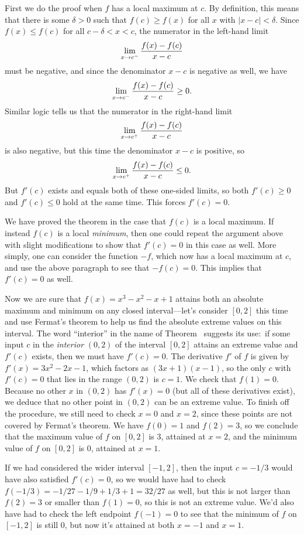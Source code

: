 \proof First we do the proof when $f$ has a local maximum at $c$. By definition, this means that there is some
$\delta > 0$ such that $f(c)\ge f(x)$ for all $x$ with $|x-c|<\delta$. Since $f(x) \le f(c)$ for all
$c-\delta < x<c$, the numerator in the left-hand limit
$$\lim_{x\to c^-} {f(x) - f(c)\over x-c}$$
must be negative, and since the denominator $x-c$ is negative as well, we have
$$\lim_{x\to c^-} {f(x) - f(c)\over x-c} \ge 0.$$
Similar logic tells us that the numerator in the right-hand limit
$$\lim_{x\to c^+} {f(x) - f(c) \over x-c}$$
is also negative, but this time the denominator $x-c$ is positive, so
$$\lim_{x\to c^+} {f(x) - f(c) \over x-c} \le 0.$$
But $f'(c)$ exists and equals both of these one-sided limits, so both $f'(c) \ge 0$ and $f'(c)\le 0$
hold at the same time. This forces $f'(c) = 0$.

We have proved the theorem in the case that $f(c)$ is a local maximum. If instead $f(c)$ is a local
{\it minimum}, then one could repeat the argument above with slight modifications to show that
$f'(c) = 0$ in this case as well. More simply, one can consider the function $-f$, which now has a local
maximum at $c$, and use
the above paragraph to see that $-f(c) = 0$. This implies that $f'(c) = 0$ as well.\slug

Now we are sure that $f(x) = x^3 - x^2 - x + 1$ attains both an absolute maximum and minimum
on any closed interval---let's consider $[0,2]$ this time and use Fermat's theorem to help us
find the absolute extreme values on this interval. The word ``interior'' in the name
of Theorem~{\thmfermat} suggests its use:~if some input $c$ in the {\it interior} $(0,2)$ of the
interval $[0,2]$ attains an extreme value and $f'(c)$ exists, then we must have $f'(c) = 0$.
The derivative $f'$ of $f$ is given by $f'(x) = 3x^2 - 2x - 1$, which factors as $(3x+1)(x-1)$,
so the only $c$ with $f'(c) = 0$ that lies in the range $(0,2)$ is $c=1$. We check that $f(1) = 0$.
Because no other $x$ in $(0,2)$ has $f'(x) = 0$ (but all of these derivatives exist), we deduce that
no other point in $(0,2)$ can be an extreme value. To finish off the procedure, we still need to check
$x=0$ and $x=2$, since these points are not covered by Fermat's theorem. We have $f(0) = 1$ and $f(2) = 3$,
so we conclude that the maximum value of $f$ on $[0,2]$ is $3$, attained at $x=2$, and the minimum
value of $f$ on $[0,2]$ is $0$, attained at $x=1$.

If we had considered the wider interval $[-1,2]$, then the input $c=-1/3$ would have also satisfied
$f'(c) = 0$, so we would have had to check $f(-1/3) = -1/27 - 1/9 + 1/3 + 1 = 32/27$ as well, but this
is not larger than $f(2) = 3$ or smaller than $f(1) = 0$, so this is not an extreme value.
We'd also have had to check the left endpoint $f(-1) = 0$ to see that the minimum of $f$ on $[-1,2]$
is still $0$, but now it's attained at both $x=-1$ and $x=1$.

